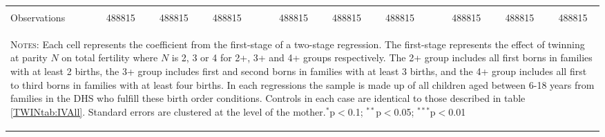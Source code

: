 \begin{landscape}
\begin{table}[htpb!]
\begin{center}
\begin{tabular}{lcccp{2mm}cccp{2mm}ccc}
\begin{footnotesize}\end{footnotesize}&\begin{footnotesize}\end{footnotesize}&\begin{footnotesize}\end{footnotesize}&\begin{footnotesize}\end{footnotesize}&\begin{footnotesize}\end{footnotesize}&\begin{footnotesize}\end{footnotesize}&\begin{footnotesize}\end{footnotesize}&\begin{footnotesize}\end{footnotesize}&\begin{footnotesize}\end{footnotesize}&\begin{footnotesize}\end{footnotesize}&\begin{footnotesize}\end{footnotesize}&\begin{footnotesize}\end{footnotesize}\\Observations&488815&488815&488815&&488815&488815&488815&&488815&488815&488815\\

\midrule\multicolumn{12}{p{19.2cm}}{\begin{footnotesize}\textsc{Notes:} Each cell represents the coefficient from the first-stage of a two-stage regression.  The first-stage represents the effect of twinning at parity $N$ on total fertility where $N$ is 2, 3 or 4 for 2+, 3+ and 4+ groups respectively.  The 2+ group includes all first borns in families with at least 2 births, the 3+ group includes first and second borns in families with at least 3 births, and the 4+ group includes all first to third borns in families with at least four births.  In each regressions the sample is made up of all children aged between 6-18 years from families in the DHS who fulfill these birth order conditions.  Controls in each case are identical to those described in table \ref{TWINtab:IVAll}.  Standard errors are clustered at the level of the mother.$^{*}$p$<$0.1; $^{**}$p$<$0.05; $^{***}$p$<$0.01 
\end{footnotesize}} \\ \bottomrule 
\end{tabular}\end{center}\end{table}\end{landscape}